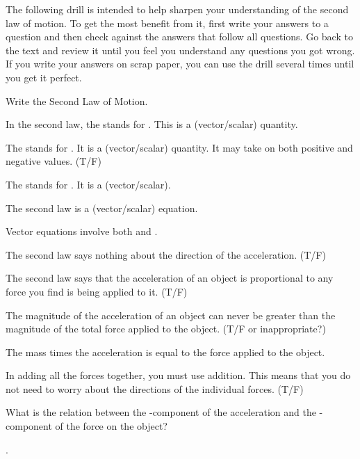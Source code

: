 {
The following drill is intended to help sharpen your understanding of the
second law of motion.
To get the most benefit from it, first write your answers to a question and
then check against the answers that follow all questions.
Go back to the text and review it until you feel you understand any questions
you got wrong.
If you write your answers on scrap paper, you can use the drill several
times until you get it perfect.
\begin{two-digit-list}
\item [1.] Write the Second Law of Motion.
\item [2.] In the second law, the  stands for \linefill{1in}.
This is a (vector/scalar) quantity.
\item [3.] The  stands for \linefill{1in}.
It is a (vector/scalar) quantity.
It may take on both positive and negative values.
(T/F)
\item [4.] The  stands for \linefill{1in}.
It is a (vector/scalar).
\item [5.] The second law is a (vector/scalar) equation.
\item [6.] Vector equations involve both \linefill{1in} and \linefill{1in}.
\item [7.] The second law says nothing about the direction of the acceleration.
(T/F)
\item [8.] The second law says that the acceleration of an object is
proportional to any force you find is being applied to it. (T/F)
\item [9.] The magnitude of the acceleration of an object can never be greater
than the magnitude of the total force applied to the object.
(T/F or inappropriate?)
\item [10.] The mass times the acceleration is equal to the \linefill{1in}
force applied to the object.
\item [11.] In adding all the forces together, you must use \linefill{1in}
addition.
This means that you do not need to worry about the directions of the
individual forces. (T/F)
\item [12.] What is the relation between the -component of the acceleration
and the -component of the force on the object?
\end{two-digit-list}

\begin{two-digit-list}
\item [1.] .


\end{two-digit-list}}
